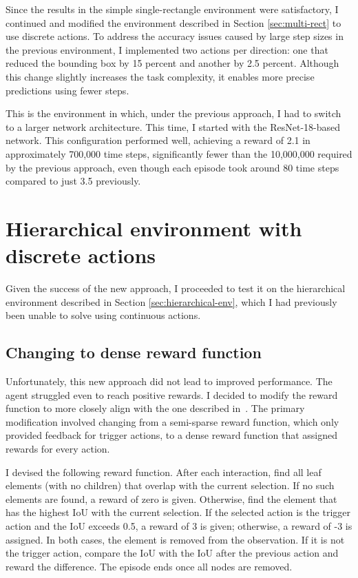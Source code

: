 \documentclass[
  digital,     %
  oneside,     %
  nosansbold,  %
  nocolorbold, %
  lof,         %
  lot,         %
]{fithesis4}
\begin{document}
Since the results in the simple single-rectangle environment were satisfactory, I continued and modified the environment described in Section \ref{sec:multi-rect} to use discrete actions. To address the accuracy issues caused by large step sizes in the previous environment, I implemented two actions per direction: one that reduced the bounding box by 15 percent and another by 2.5 percent. Although this change slightly increases the task complexity, it enables more precise predictions using fewer steps.

This is the environment in which, under the previous approach, I had to switch to a larger network architecture. This time, I started with the ResNet-18-based network. This configuration performed well, achieving a reward of 2.1 in approximately 700,000 time steps, significantly fewer than the 10,000,000 required by the previous approach, even though each episode took around 80 time steps compared to just 3.5 previously.

\section{Hierarchical environment with discrete actions}

Given the success of the new approach, I proceeded to test it on the hierarchical environment described in Section \ref{sec:hierarchical-env}, which I had previously been unable to solve using continuous actions.

\subsection{Changing to dense reward function}

Unfortunately, this new approach did not lead to improved performance. The agent struggled even to reach positive rewards. I decided to modify the reward function to more closely align with the one described in~\cite{iterative_od_with_rl}. The primary modification involved changing from a semi-sparse reward function, which only provided feedback for trigger actions, to a dense reward function that assigned rewards for every action.

I devised the following reward function. After each interaction, find all leaf elements (with no children) that overlap with the current selection. If no such elements are found, a reward of zero is given. Otherwise, find the element that has the highest IoU with the current selection. If the selected action is the trigger action and the IoU exceeds 0.5, a reward of 3 is given; otherwise, a reward of -3 is assigned. In both cases, the element is removed from the observation. If it is not the trigger action, compare the IoU with the IoU after the previous action and reward the difference. The episode ends once all nodes are removed.
\end{document}
